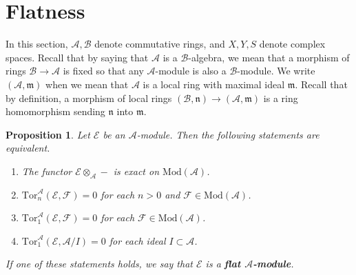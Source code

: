 \documentclass[12pt,b5paper,notitlepage]{report}
\theoremstyle{definition}
\theoremstyle{plain}
\newtheorem{pp}[df]{Proposition}
\newcommand{\fk}{\mathfrak}
\newcommand{\mc}{\mathcal}
\newcommand{\Tor}{\mathrm{Tor}}
\newcommand{\Mod}{\mathrm{Mod}}
\numberwithin{equation}{section}
\begin{document}
\section{Flatness}

In this section,  $\mc A,\mc B$ denote commutative rings, and $X,Y,S$ denote complex spaces. Recall that by saying that $\mc A$ is a $\mc B$-algebra, we mean that a morphism of rings $\mc B\rightarrow\mc A$ is fixed so that any $\mc A$-module is also a $\mc B$-module. We write $(\mc A,\fk m)$ when we mean that $\mc A$ is a local ring with maximal ideal $\fk m$. Recall that by definition, a morphism of local rings $(\mc B,\fk n)\rightarrow(\mc A,\fk m)$ is a ring homomorphism sending $\fk n$ into $\fk m$.


\begin{pp}\label{lb343}
Let $\mc E$ be an $\mc A$-module. Then the following statements are equivalent.
\begin{enumerate}[label=(\arabic*)]
\item The functor $\mc E\otimes_{\mc A}-$ is exact on $\Mod(\mc A)$.
\item $\Tor_n^{\mc A}(\mc E,\mc F)=0$ for each $n>0$ and $\mc F\in\Mod(\mc A)$.
\item $\Tor_1^{\mc A}(\mc E,\mc F)=0$ for each $\mc F\in\Mod(\mc A)$.
\item $\Tor_1^{\mc A}(\mc E,\mc A/I)=0$ for each ideal $I\subset\mc A$.
\end{enumerate}
If one of these statements holds, we say that $\mc E$ is a \textbf{flat $\mc A$-module}. 
\end{pp}
\end{document}
